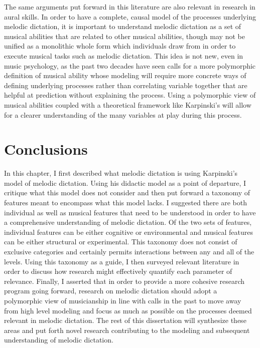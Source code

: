 \documentclass[12pt,]{book}
\begin{document}
The same arguments put forward in this literature are also relevant in research in aural skills.
In order to have a complete, causal model of the processes underlying melodic dictation, it is important to understand melodic dictation as a set of musical abilities that are related to other musical abilities, though may not be unified as a monolithic whole form which individuals draw from in order to execute musical tasks such as melodic dictation.
This idea is not new, even in music psychology, as the past two decades have seen calls for a more polymorphic definition of musical ability \citep{levitinWhatDoesIt2012, peretzModularityMusicProcessing2003} whose modeling will require more concrete ways of defining underlying processes rather than correlating variable together that are helpful at prediction without explaining the process.
Using a polymorphic view of musical abilities coupled with a theoretical framework like Karpinski's will allow for a clearer understanding of the many variables at play during this process.

\hypertarget{conclusions}{%
\section{Conclusions}\label{conclusions}}

In this chapter, I first described what melodic dictation is using Karpinski's model of melodic dictation.
Using his didactic model as a point of departure, I critique what this model does not consider and then put forward a taxonomy of features meant to encompass what this model lacks.
I suggested there are both individual as well as musical features that need to be understood in order to have a comprehensive understanding of melodic dictation.
Of the two sets of features, individual features can be either cognitive or environmental and musical features can be either structural or experimental.
This taxonomy does not consist of exclusive categories and certainly permits interactions between any and all of the levels.
Using this taxonomy as a guide, I then surveyed relevant literature in order to discuss how research might effectively quantify each parameter of relevance.
Finally, I asserted that in order to provide a more cohesive research program going forward, research on melodic dictation should adopt a polymorphic view of musicianship in line with calls in the past to move away from high level modeling and focus as much as possible on the processes deemed relevant in melodic dictation.
The rest of this dissertation will synthesize these areas and put forth novel research contributing to the modeling and subsequent understanding of melodic dictation.
\end{document}

